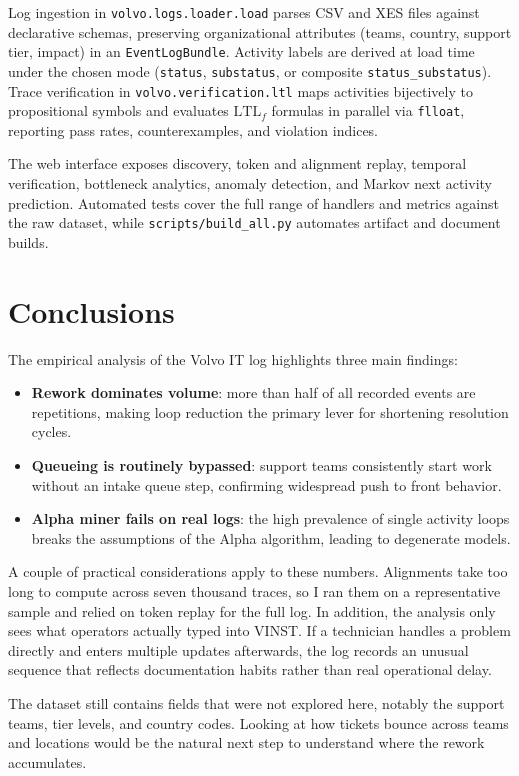 \documentclass[12pt,a4paper]{article}
\begin{document}
Log ingestion in \texttt{volvo.logs.loader.load} parses CSV and XES files against declarative schemas, preserving organizational attributes (teams, country, support tier, impact) in an \texttt{EventLogBundle}. Activity labels are derived at load time under the chosen mode (\texttt{status}, \texttt{substatus}, or composite \texttt{status\_substatus}). Trace verification in \texttt{volvo.verification.ltl} maps activities bijectively to propositional symbols and evaluates $\text{LTL}_f$ formulas in parallel via \texttt{flloat}, reporting pass rates, counterexamples, and violation indices.

The web interface exposes discovery, token and alignment replay, temporal verification, bottleneck analytics, anomaly detection, and Markov next activity prediction. Automated tests cover the full range of handlers and metrics against the raw dataset, while \texttt{scripts/build\_all.py} automates artifact and document builds.

\section{Conclusions}\label{sec:conclusions}

The empirical analysis of the Volvo IT log highlights three main findings:
\begin{itemize}
  \item \textbf{Rework dominates volume}: more than half of all recorded events are repetitions, making loop reduction the primary lever for shortening resolution cycles.
  \item \textbf{Queueing is routinely bypassed}: support teams consistently start work without an intake queue step, confirming widespread push to front behavior.
  \item \textbf{Alpha miner fails on real logs}: the high prevalence of single activity loops breaks the assumptions of the Alpha algorithm, leading to degenerate models.
\end{itemize}

A couple of practical considerations apply to these numbers. Alignments take too long to compute across seven thousand traces, so I ran them on a representative sample and relied on token replay for the full log. In addition, the analysis only sees what operators actually typed into VINST. If a technician handles a problem directly and enters multiple updates afterwards, the log records an unusual sequence that reflects documentation habits rather than real operational delay.

The dataset still contains fields that were not explored here, notably the support teams, tier levels, and country codes. Looking at how tickets bounce across teams and locations would be the natural next step to understand where the rework accumulates.
\end{document}
